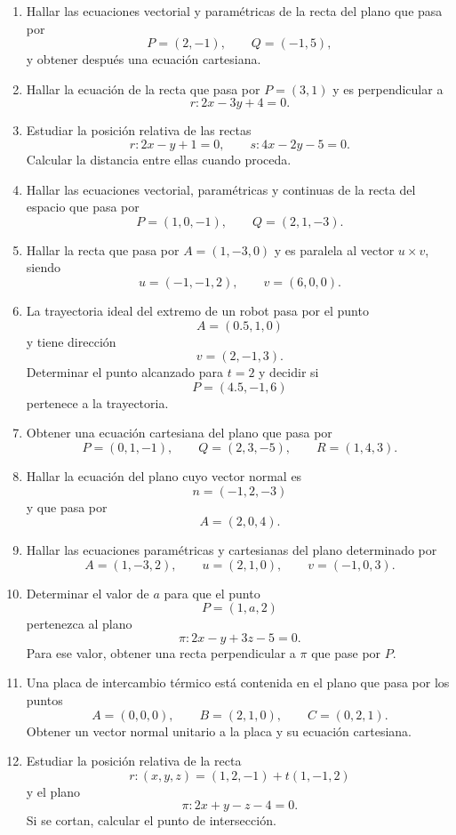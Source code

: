 \begin{enumerate}
\item Hallar las ecuaciones vectorial y paramétricas de la recta del plano que pasa por
\[
P=(2,-1),\qquad Q=(-1,5),
\]
y obtener después una ecuación cartesiana.

\item Hallar la ecuación de la recta que pasa por $P=(3,1)$ y es perpendicular a
\[
r:2x-3y+4=0.
\]

\item Estudiar la posición relativa de las rectas
\[
r:2x-y+1=0,
\qquad
s:4x-2y-5=0.
\]
Calcular la distancia entre ellas cuando proceda.

\item Hallar las ecuaciones vectorial, paramétricas y continuas de la recta del espacio que pasa por
\[
P=(1,0,-1),\qquad Q=(2,1,-3).
\]

\item Hallar la recta que pasa por $A=(1,-3,0)$ y es paralela al vector $u\times v$, siendo
\[
u=(-1,-1,2),\qquad v=(6,0,0).
\]

\item La trayectoria ideal del extremo de un robot pasa por el punto
\[
A=(0.5,1,0)
\]
y tiene dirección
\[
v=(2,-1,3).
\]
Determinar el punto alcanzado para $t=2$ y decidir si
\[
P=(4.5,-1,6)
\]
pertenece a la trayectoria.

\item Obtener una ecuación cartesiana del plano que pasa por
\[
P=(0,1,-1),\qquad Q=(2,3,-5),\qquad R=(1,4,3).
\]

\item Hallar la ecuación del plano cuyo vector normal es
\[
n=(-1,2,-3)
\]
y que pasa por
\[
A=(2,0,4).
\]

\item Hallar las ecuaciones paramétricas y cartesianas del plano determinado por
\[
A=(1,-3,2),\qquad u=(2,1,0),\qquad v=(-1,0,3).
\]

\item Determinar el valor de $a$ para que el punto
\[
P=(1,a,2)
\]
pertenezca al plano
\[
\pi:2x-y+3z-5=0.
\]
Para ese valor, obtener una recta perpendicular a $\pi$ que pase por $P$.

\item Una placa de intercambio térmico está contenida en el plano que pasa por los puntos
\[
A=(0,0,0),\qquad B=(2,1,0),\qquad C=(0,2,1).
\]
Obtener un vector normal unitario a la placa y su ecuación cartesiana.

\item Estudiar la posición relativa de la recta
\[
r:(x,y,z)=(1,2,-1)+t(1,-1,2)
\]
y el plano
\[
\pi:2x+y-z-4=0.
\]
Si se cortan, calcular el punto de intersección.


\end{enumerate}
